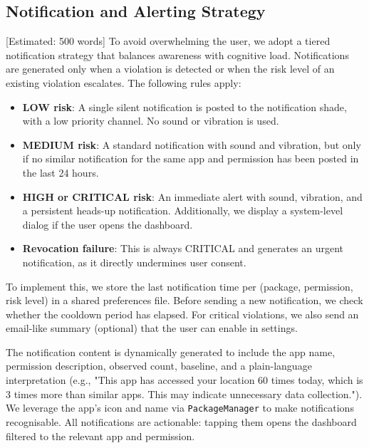 \subsection{Notification and Alerting Strategy} [Estimated: 500 words]
To avoid overwhelming the user, we adopt a tiered notification strategy that balances awareness with cognitive load. Notifications are generated only when a violation is detected or when the risk level of an existing violation escalates. The following rules apply:

\begin{itemize}
\item \textbf{LOW risk}: A single silent notification is posted to the notification shade, with a low priority channel. No sound or vibration is used.
\item \textbf{MEDIUM risk}: A standard notification with sound and vibration, but only if no similar notification for the same app and permission has been posted in the last 24 hours.
\item \textbf{HIGH or CRITICAL risk}: An immediate alert with sound, vibration, and a persistent heads-up notification. Additionally, we display a system-level dialog if the user opens the dashboard.
\item \textbf{Revocation failure}: This is always CRITICAL and generates an urgent notification, as it directly undermines user consent.
\end{itemize}

To implement this, we store the last notification time per (package, permission, risk level) in a shared preferences file. Before sending a new notification, we check whether the cooldown period has elapsed. For critical violations, we also send an email-like summary (optional) that the user can enable in settings.

The notification content is dynamically generated to include the app name, permission description, observed count, baseline, and a plain-language interpretation (e.g., "This app has accessed your location 60 times today, which is 3 times more than similar apps. This may indicate unnecessary data collection."). We leverage the app's icon and name via \texttt{PackageManager} to make notifications recognisable. All notifications are actionable: tapping them opens the dashboard filtered to the relevant app and permission.

